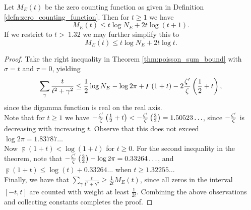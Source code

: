 \begin{corollary}\label{cor:zero_density}
Let $M_E(t)$ be the zero counting function as given in Definition \ref{defn:zero_counting_function}. Then for $t \ge 1$ we have
\begin{equation}
M_E(t) \le t\log N_E +2t\log(t+1).
\end{equation}
If we restrict to $t>~1.32$ we may further simplify this to
\begin{equation}
M_E(t) \le t\log N_E +2t\log t.
\end{equation}
\end{corollary}
\begin{proof}
Take the right inequality in Theorem \ref{thm:poisson_sum_bound} with $\sigma = t$ and $\tau=0$, yielding
\begin{equation*}
\sum_{\gamma} \frac{t}{t^2+\gamma^2} \le \frac{1}{2}\log N_E - \log 2\pi + \digamma(1+t) - 2\frac{\zeta^{\prime}}{\zeta}\left(\frac{1}{2}+t\right),
\end{equation*}
since the digamma function is real on the real axis. \\

Note that for $t \ge 1$ we have $-\frac{\zeta^{\prime}}{\zeta}\left(\frac{1}{2}+t\right) < -\frac{\zeta^{\prime}}{\zeta}\left(\frac{3}{2}\right) = 1.50523\ldots$, since $-\frac{\zeta^{\prime}}{\zeta}$ is decreasing with increasing $t$. Observe that this does not exceed $\log 2\pi = 1.83787\ldots$  \\

Now $\digamma(1+t) < \log(1+t)$ for $t\ge0$. For the second inequality in the theorem, note that $-\frac{\zeta^{\prime}}{\zeta}\left(\frac{3}{2}\right) - \log 2\pi = 0.33264\ldots$, and $\digamma(1+t) \le \log(t) + 0.33264\ldots$ when $t\ge 1.32255\ldots$ \\

Finally, we have that $\sum_{\gamma} \frac{t}{t^2+\gamma^2} \ge \frac{1}{2t}M_E(t)$, since all zeros in the interval $[-t,t]$ are counted with weight at least $\frac{1}{2t}$. Combining the above observations and collecting constants completes the proof.
\end{proof}

